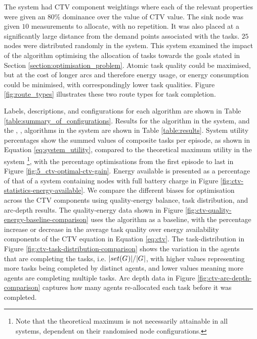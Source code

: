 
The \simulationExtended{}{} system had CTV component weightings where each of the relevant properties were given an $80\%$ dominance over the value of CTV value. The sink node was given $10$ measurements to allocate, with no repetition. It was also placed at a significantly large distance from the demand points associated with the tasks. $25$ nodes were distributed randomly in the system. This system examined the impact of the algorithm optimising the allocation of tasks towards the goals stated in Section \ref{section:optimisation_problem}. Atomic task quality could be maximised, but at the cost of longer arcs and therefore energy usage, or energy consumption could be minimised, with correspondingly lower task qualities. Figure \ref{fig:route_types} illustrates these two route types for task completion.

Labels, descriptions, and configurations for each algorithm are shown in Table \ref{table:summary_of_configurations}. Results for the \algorithmBalanced{}{} algorithm in the \simulationSimple{}{} system, and the \algorithmEnergy{}{}, \algorithmQuality{}{}, \algorithmDistribution{}{} algorithms in the \simulationExtended{}{} system are shown in Table \ref{table:results}. System utility percentages show the summed values of composite tasks per episode, as shown in Equation \ref{eq:system_utility}, compared to the theoretical maximum utility in the system \footnote{Note that the theoretical maximum is not necessarily attainable in all systems, dependent on their randomised node configurations.}, with the percentage optimisations from the first episode to last in Figure \ref{fig:5_ctv-optimal-ctv-gain}. Energy available is presented as a percentage of that of a system containing nodes with full battery charge in Figure \ref{fig:ctv-statistics-energy-available}. We compare the different biases for optimisation across the CTV components using quality-energy balance, task distribution, and arc-depth results. The quality-energy data shown in Figure \ref{fig:ctv-quality-energy-baseline-comparison} uses the \algorithmEnergy{}{} algorithm as a baseline, with the percentage increase or decrease in the average task quality over energy availability components of the CTV equation in Equation \ref{eq:ctv}. The task-distribution in Figure \ref{fig:ctv-task-distribution-comparison} shows the variation in the agents that are completing the tasks, i.e. $\lvert set(G_{}^{}) \rvert{}/\lvert G_{}^{} \rvert{}$, with higher values representing more tasks being completed by distinct agents, and lower values meaning more agents are completing multiple tasks. Arc depth data in Figure \ref{fig:ctv-arc-depth-comparison} captures how many agents re-allocated each task before it was completed.